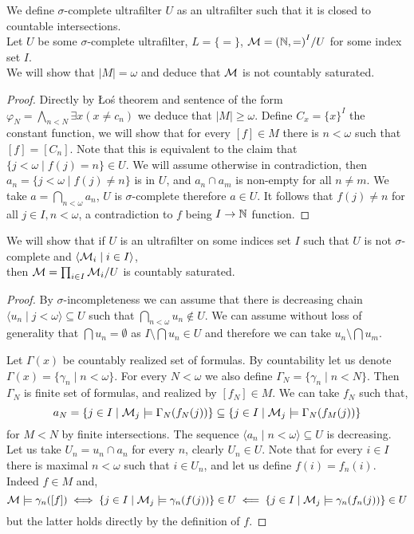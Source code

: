 \subquestion{}
We define $\sigma$-complete ultrafilter $U$ as an ultrafilter such that it is closed to countable intersections. \\
Let $U$ be some $\sigma$-complete ultrafilter, $L = \{ = \}$, $\mathcal{M} = {(\mathbb{N}, =)}^I / U$ for some index set $I$. \\
We will show that $|M| = \omega$ and deduce that $\mathcal{M}$ is not countably saturated.
\begin{proof}
	Directly by Łoś theorem and sentence of the form $\varphi_N = \bigwedge_{n < N} \exists x (x \ne c_n)$ we deduce that $|M| \ge \omega$.
	Define $C_x = {\{ x \}}^I$ the constant function, we will show that for every $[f] \in M$ there is $n < \omega$ such that $[f] = [C_n]$.
	Note that this is equivalent to the claim that $\{ j < \omega \mid f(j) = n \} \in U$.
	We will assume otherwise in contradiction, then $a_n = \{ j < \omega \mid f(j) \ne n \}$ is in $U$, and $a_n \cap a_m$ is non-empty for all $n \ne m$.
	We take $a = \bigcap_{n < \omega} a_n$, $U$ is $\sigma$-complete therefore $a \in U$.
	It follows that $f(j) \ne n$ for all $j \in I, n < \omega$, a contradiction to $f$ being $I \to \mathbb{N}$ function.
\end{proof}

\subquestion{}
We will show that if $U$ is an ultrafilter on some indices set $I$ such that $U$ is not $\sigma$-complete and $\langle \mathcal{M}_i \mid i \in I \rangle$, \\
then $\mathcal{M} = \prod_{i \in I} \mathcal{M}_i / U$ is countably saturated.
\begin{proof}
	By $\sigma$-incompleteness we can assume that there is decreasing chain $\langle u_n \mid j < \omega \rangle \subseteq U$ such that $\bigcap_{n < \omega} u_n \notin U$.
	We can assume without loss of generality that $\bigcap u_n = \emptyset$ as $I \setminus \bigcap u_n \in U$ and therefore we can take $u_n \setminus \bigcap u_m$.

	Let $\Gamma(x)$ be countably realized set of formulas.
	By countability let us denote $\Gamma(x) = \{ \gamma_n \mid n < \omega \}$.
	For every $N < \omega$ we also define $\Gamma_N = \{ \gamma_n \mid n < N \}$.
	Then $\Gamma_N$ is finite set of formulas, and realized by $[f_N] \in M$.
	We can take $f_N$ such that,
	\[
		a_N = \{ j \in I \mid \mathcal{M}_j \models \Gamma_N(f_N(j)) \}
		\subseteq \{ j \in I \mid \mathcal{M}_j \models \Gamma_N(f_M(j)) \}
	\]
	for $M < N$ by finite intersections.
	The sequence $\langle a_n \mid n < \omega \rangle \subseteq U$ is decreasing.
	Let us take $U_n = u_n \cap a_n$ for every $n$, clearly $U_n \in U$.
	Note that for every $i \in I$ there is maximal $n < \omega$ such that $i \in U_n$, and let us define $f(i) = f_n(i)$.
	Indeed $f \in M$ and,
	\[
		\mathcal{M} \models \gamma_n([f])
		\iff \{ j \in I \mid \mathcal{M}_j \models \gamma_n(f(j)) \} \in U
		\impliedby \{ j \in I \mid \mathcal{M}_j \models \gamma_n(f_n(j)) \} \in U
	\]
	but the latter holds directly by the definition of $f$.
\end{proof}

